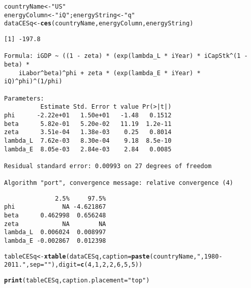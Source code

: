 \documentclass[preprint,authoryear,12pt]{elsarticle}\usepackage{graphicx, color}
\makeatletter
\newcommand{\hlfunctioncall}[1]{\textcolor[rgb]{0.501960784313725,0,0.329411764705882}{\textbf{#1}}}%
\newcommand{\hlstring}[1]{\textcolor[rgb]{0.6,0.6,1}{#1}}%
\newenvironment{kframe}{%
 \def\at@end@of@kframe{}%
 \ifinner\ifhmode%
  \def\at@end@of@kframe{\end{minipage}}%
  \begin{minipage}{\columnwidth}%
 \fi\fi%
 \def\FrameCommand##1{\hskip\@totalleftmargin \hskip-\fboxsep
 \colorbox{shadecolor}{##1}\hskip-\fboxsep
     \hskip-\linewidth \hskip-\@totalleftmargin \hskip\columnwidth}%
 \MakeFramed {\advance\hsize-\width
   \@totalleftmargin\z@ \linewidth\hsize
   \@setminipage}}%
 {\par\unskip\endMakeFramed%
 \at@end@of@kframe}
\newenvironment{knitrout}{}{} %
\makeatother
\begin{document}
\begin{knitrout}
\color{fgcolor}\begin{kframe}
\begin{alltt}
countryName <- \hlstring{"US"}
energyColumn <- \hlstring{"iQ"}; energyString <- \hlstring{"q"}
dataCESq <- \hlfunctioncall{ces}(countryName, energyColumn, energyString)
\end{alltt}
\begin{verbatim}
[1] -197.8

Formula: iGDP ~ ((1 - zeta) * (exp(lambda_L * iYear) * iCapStk^(1 - beta) * 
    iLabor^beta)^phi + zeta * (exp(lambda_E * iYear) * iQ)^phi)^(1/phi)

Parameters:
          Estimate Std. Error t value Pr(>|t|)
phi      -2.22e+01   1.50e+01   -1.48   0.1512
beta      5.82e-01   5.20e-02   11.19  1.2e-11
zeta      3.51e-04   1.38e-03    0.25   0.8014
lambda_L  7.62e-03   8.30e-04    9.18  8.5e-10
lambda_E  8.05e-03   2.84e-03    2.84   0.0085

Residual standard error: 0.00993 on 27 degrees of freedom

Algorithm "port", convergence message: relative convergence (4) 
\end{verbatim}


{\ttfamily\noindent\itshape\color{messagecolor}{Waiting for profiling to be done...}}\begin{verbatim}
              2.5%     97.5%
phi             NA -4.621867
beta      0.462998  0.656248
zeta            NA        NA
lambda_L  0.006024  0.008997
lambda_E -0.002867  0.012398
\end{verbatim}


{\ttfamily\noindent\bfseries\color{errorcolor}{Error: could not find function "deltaMethod"}}\begin{alltt}
tableCESq <- \hlfunctioncall{xtable}(dataCESq, caption=\hlfunctioncall{paste}(countryName, \hlstring{", 1980-2011."}, sep=\hlstring{""}), digit = \hlfunctioncall{c}(4, 1, 2, 2, 6, 5, 5))
\end{alltt}


{\ttfamily\noindent\bfseries\color{errorcolor}{Error: could not find function "xtable"}}\end{kframe}
\end{knitrout}


\begin{kframe}
\begin{alltt}
\hlfunctioncall{print}(tableCESq, caption.placement=\hlstring{"top"})
\end{alltt}


{\ttfamily\noindent\bfseries\color{errorcolor}{Error: error in evaluating the argument 'x' in selecting a method for function 'print': Error: object 'tableCESq' not found}}\end{kframe}
\end{document}

